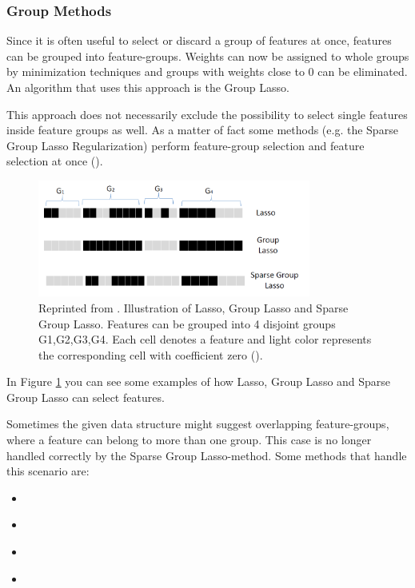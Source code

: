 \subsubsection{Group Methods}
\label{sec:methods.structured.group}

  
Since it is often useful to select or discard a group of features at once,
features can be grouped into feature-groups. Weights can now be assigned to
whole groups by minimization techniques and groups with weights close to $0$ can be
eliminated. An algorithm that uses this approach is the Group Lasso. 

This approach does not necessarily exclude the possibility to select single
features inside feature groups as well. As a matter of fact some methods
(e.g. the Sparse Group Lasso Regularization) perform feature-group selection and
feature selection at once (\cite{Tang:14}).

\begin{figure}[!ht]
  \centering 
  \includegraphics[width=0.8\textwidth]{chapters/methods/structured/group_lasso}
  \caption{Reprinted from \cite{Tang:14}. Illustration of Lasso, Group Lasso
  and Sparse Group Lasso.
  Features can be grouped into 4 disjoint groups {G1,G2,G3,G4}. Each cell denotes a feature and light color
represents the corresponding cell with coefficient zero (\cite{Tang:14}).}
  \label{fig:methods.structured.group.lasso}
\end{figure}

In Figure \ref{fig:methods.structured.group.lasso} you can see some examples of
how Lasso, Group Lasso and Sparse Group Lasso can select features. 

Sometimes the given data structure might suggest overlapping feature-groups,
where a feature can belong to more than one group. This case is no longer
handled correctly by the Sparse Group Lasso-method. Some methods that handle
this scenario are:

\begin{itemize}
  \item \cite{Liu:10}
  \item \cite{Kim:10}
  \item \cite{Jenatton:10}
  \item \cite{Jacob:09}
\end{itemize}





